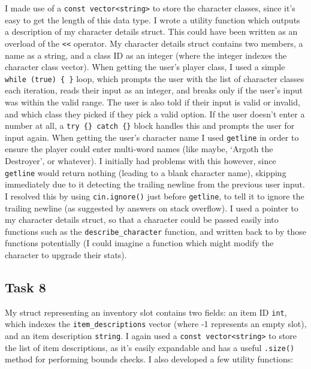 \documentclass[
]{article}
\begin{document}
I made use of a \texttt{const\ vector\textless{}string\textgreater{}} to
store the character classes, since it's easy to get the length of this
data type. I wrote a utility function which outputs a description of my
character details struct. This could have been written as an overload of
the \texttt{\textless{}\textless{}} operator. My character details
struct contains two members, a name as a string, and a class ID as an
integer (where the integer indexes the character class vector). When
getting the user's player class, I used a simple
\texttt{while\ (true)\ \{\ \}} loop, which prompts the user with the
list of character classes each iteration, reads their input as an
integer, and breaks only if the user's input was within the valid range.
The user is also told if their input is valid or invalid, and which
class they picked if they pick a valid option. If the user doesn't enter
a number at all, a \texttt{try\ \{\}\ catch\ \{\}} block handles this
and prompts the user for input again. When getting the user's character
name I used \texttt{getline} in order to ensure the player could enter
multi-word names (like maybe, `Argoth the Destroyer', or whatever). I
initially had problems with this however, since \texttt{getline} would
return nothing (leading to a blank character name), skipping immediately
due to it detecting the trailing newline from the previous user input. I
resolved this by using \texttt{cin.ignore()} just before
\texttt{getline}, to tell it to ignore the trailing newline (as
suggested by answers on stack overflow). I used a pointer to my
character details struct, so that a character could be passed easily
into functions such as the \texttt{describe\_character} function, and
written back to by those functions potentially (I could imagine a
function which might modify the character to upgrade their stats).

\subsection{Task 8}\label{task-8}

My struct representing an inventory slot contains two fields: an item ID
\texttt{int}, which indexes the \texttt{item\_descriptions} vector
(where -1 represents an empty slot), and an item description
\texttt{string}. I again used a
\texttt{const\ vector\textless{}string\textgreater{}} to store the list
of item descriptions, as it's easily expandable and has a useful
\texttt{.size()} method for performing bounds checks. I also developed a
few utility functions:
\end{document}
